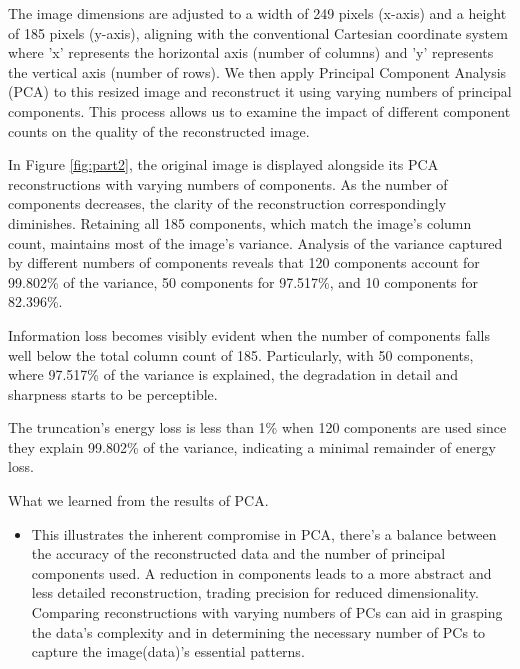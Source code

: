 \begin{itemize}
The image dimensions are adjusted to a width of 249 pixels (x-axis) and a height of 185 pixels (y-axis), aligning with the conventional Cartesian coordinate system where 'x' represents the horizontal axis (number of columns) and 'y' represents the vertical axis (number of rows). We then apply Principal Component Analysis (PCA) to this resized image and reconstruct it using varying numbers of principal components. This process allows us to examine the impact of different component counts on the quality of the reconstructed image.


In Figure \ref{fig:part2}, the original image is displayed alongside its PCA reconstructions with varying numbers of components. As the number of components decreases, the clarity of the reconstruction correspondingly diminishes. Retaining all 185 components, which match the image's column count, maintains most of the image's variance. Analysis of the variance captured by different numbers of components reveals that 120 components account for 99.802\% of the variance, 50 components for 97.517\%, and 10 components for 82.396\%.

Information loss becomes visibly evident when the number of components falls well below the total column count of 185. Particularly, with 50 components, where 97.517\% of the variance is explained, the degradation in detail and sharpness starts to be perceptible.

The truncation's energy loss is less than 1\% when 120 components are used since they explain 99.802\% of the variance, indicating a minimal remainder of energy loss.

What we learned from the results of PCA.
    \begin{itemize} 
    \item This illustrates the inherent compromise in PCA, there's a balance between the accuracy of the reconstructed data and the number of principal components used. A reduction in components leads to a more abstract and less detailed reconstruction, trading precision for reduced dimensionality. Comparing reconstructions with varying numbers of PCs can aid in grasping the data's complexity and in determining the necessary number of PCs to capture the image(data)'s essential patterns.
    \end{itemize}









\end{itemize}
